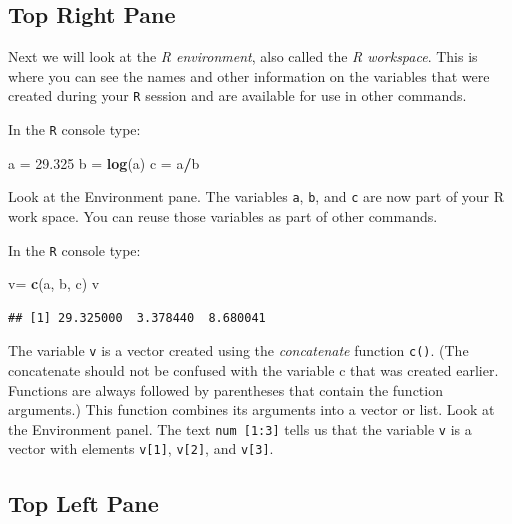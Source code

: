 \documentclass[
]{book}
\newenvironment{Shaded}{\begin{snugshade}}{\end{snugshade}}
\newcommand{\FloatTok}[1]{\textcolor[rgb]{0.00,0.00,0.81}{#1}}
\newcommand{\KeywordTok}[1]{\textcolor[rgb]{0.13,0.29,0.53}{\textbf{#1}}}
\newcommand{\NormalTok}[1]{#1}
\newcommand{\OperatorTok}[1]{\textcolor[rgb]{0.81,0.36,0.00}{\textbf{#1}}}
\newcommand{\StringTok}[1]{\textcolor[rgb]{0.31,0.60,0.02}{#1}}
\begin{document}
\hypertarget{top-right-pane}{%
\subsection*{Top Right Pane}\label{top-right-pane}}

Next we will look at the \emph{R environment}, also called the \emph{R workspace}. This is where you can see the names and other information on the variables that were created during your \texttt{R} session and are available for use in other commands.

In the \texttt{R} console type:

\begin{Shaded}
\begin{Highlighting}[]
\NormalTok{a =}\StringTok{ }\FloatTok{29.325}
\NormalTok{b =}\StringTok{ }\KeywordTok{log}\NormalTok{(a)}
\NormalTok{c =}\StringTok{ }\NormalTok{a}\OperatorTok{/}\NormalTok{b}
\end{Highlighting}
\end{Shaded}

Look at the Environment pane. The variables \texttt{a}, \texttt{b}, and \texttt{c} are now part of your R work space. You can reuse those variables as part of other commands.

In the \texttt{R} console type:

\begin{Shaded}
\begin{Highlighting}[]
\NormalTok{v=}\StringTok{ }\KeywordTok{c}\NormalTok{(a, b, c)}
\NormalTok{v}
\end{Highlighting}
\end{Shaded}

\begin{verbatim}
## [1] 29.325000  3.378440  8.680041
\end{verbatim}

The variable \texttt{v} is a vector created using the \emph{concatenate} function \texttt{c()}. (The concatenate should not be confused with the variable c that was created earlier. Functions are always followed by parentheses that contain the function arguments.) This function combines its arguments into a vector or list. Look at the Environment panel. The text \texttt{num\ {[}1:3{]}} tells us that the variable \texttt{v} is a vector with elements \texttt{v{[}1{]}}, \texttt{v{[}2{]}}, and \texttt{v{[}3{]}}.

\hypertarget{top-left-pane}{%
\subsection*{Top Left Pane}\label{top-left-pane}}
\end{document}
